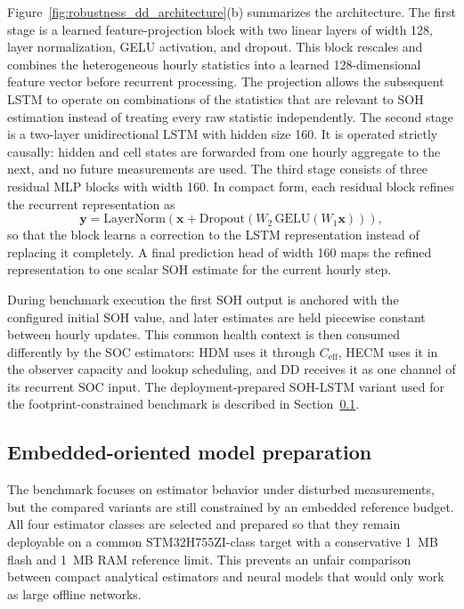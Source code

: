 \documentclass[
    a4paper,
    12pt,
    titlepage,
    bibliography=totoc,
    twoside=on,
    parskip=false,
    numbers=noenddot,
    cleardoublepage=empty,
    DIV=12,
    BCOR=12.0mm,
    headheight=36pt,
    headings=openright
]{scrreprt}
\begin{document}
Figure~\ref{fig:robustness_dd_architecture}(b) summarizes the architecture. The first stage is a learned feature-projection block with two linear layers of width 128, layer normalization, GELU activation, and dropout. This block rescales and combines the heterogeneous hourly statistics into a learned 128-dimensional feature vector before recurrent processing. The projection allows the subsequent LSTM to operate on combinations of the statistics that are relevant to SOH estimation instead of treating every raw statistic independently. The second stage is a two-layer unidirectional LSTM with hidden size 160. It is operated strictly causally: hidden and cell states are forwarded from one hourly aggregate to the next, and no future measurements are used. The third stage consists of three residual MLP blocks with width 160. In compact form, each residual block refines the recurrent representation as
\begin{equation}
    \mathbf{y} = \mathrm{LayerNorm}\!\left(\mathbf{x} + \mathrm{Dropout}\!\left(W_2\,\mathrm{GELU}(W_1\mathbf{x})\right)\right),
    \label{eq:robustness_soh_residual_block}
\end{equation}
so that the block learns a correction to the LSTM representation instead of replacing it completely. A final prediction head of width 160 maps the refined representation to one scalar SOH estimate for the current hourly step.

During benchmark execution the first SOH output is anchored with the configured initial SOH value, and later estimates are held piecewise constant between hourly updates. This common health context is then consumed differently by the SOC estimators: HDM uses it through $C_{\mathrm{eff}}$, HECM uses it in the observer capacity and lookup scheduling, and DD receives it as one channel of its recurrent SOC input. The deployment-prepared SOH-LSTM variant used for the footprint-constrained benchmark is described in Section~\ref{sec:robustness_embedded_preparation}.

\subsection{Embedded-oriented model preparation}
\label{sec:robustness_embedded_preparation}
The benchmark focuses on estimator behavior under disturbed measurements, but the compared variants are still constrained by an embedded reference budget. All four estimator classes are selected and prepared so that they remain deployable on a common STM32H755ZI-class target with a conservative \SI{1}{MB} flash and \SI{1}{MB} RAM reference limit. This prevents an unfair comparison between compact analytical estimators and neural models that would only work as large offline networks.
\end{document}

